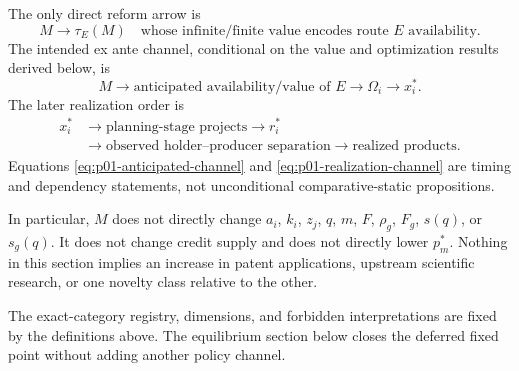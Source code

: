 The only direct reform arrow is
\begin{equation}
  M\longrightarrow \tau_E(M)
  \quad\text{whose infinite/finite value encodes route }E\text{ availability}.
  \label{eq:p01-only-direct-policy-arrow}
\end{equation}
The intended ex ante channel, conditional on the value and optimization results
derived below, is
\begin{equation}
  M
  \longrightarrow
  \text{anticipated availability/value of }E
  \longrightarrow
  \Omega_i
  \longrightarrow
  x_i^*.
  \label{eq:p01-anticipated-channel}
\end{equation}
The later realization order is
\begin{equation}
  \begin{aligned}
    x_i^*
    &\longrightarrow
    \text{planning-stage projects}
    \longrightarrow r_i^* \\
    &\longrightarrow
    \text{observed holder--producer separation}
    \longrightarrow
    \text{realized products}.
  \end{aligned}
  \label{eq:p01-realization-channel}
\end{equation}
Equations \eqref{eq:p01-anticipated-channel} and
\eqref{eq:p01-realization-channel} are timing and dependency statements, not
unconditional comparative-static propositions.

In particular, \(M\) does not directly change \(a_i\), \(k_i\), \(z_j\),
\(q\), \(m\), \(F\), \(\rho_g\), \(F_g\), \(s(q)\), or \(s_g(q)\).  It does
not change credit supply and does not directly lower \(p_m^*\). Nothing in this section implies an increase in
patent applications, upstream scientific research, or one novelty class
relative to the other.

The exact-category registry, dimensions, and forbidden interpretations are
fixed by the definitions above.  The equilibrium section below closes the
deferred fixed point without adding another policy channel.
